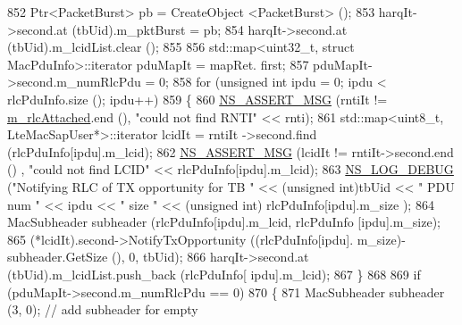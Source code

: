 \begin{DoxyCode}
852                                         Ptr<PacketBurst> pb = CreateObject <PacketBurst> ();
853                                         harqIt->second.at (tbUid).m\_pktBurst = pb;
854                                         harqIt->second.at (tbUid).m\_lcidList.clear ();
855 
856                                         std::map<uint32\_t, struct MacPduInfo>::iterator pduMapIt = mapRet.
      first;
857                                         pduMapIt->second.m\_numRlcPdu = 0;
858                                         \textcolor{keywordflow}{for} (\textcolor{keywordtype}{unsigned} \textcolor{keywordtype}{int} ipdu = 0; ipdu < rlcPduInfo.size (); ipdu++)
859                                         \{
860                                                 \hyperlink{assert_8h_aff5ece9066c74e681e74999856f08539}{NS\_ASSERT\_MSG} (rntiIt != 
      \hyperlink{classns3_1_1MmWaveEnbMac_a13e4bafd30f3edae1f5dc1192c9b3011}{m\_rlcAttached}.end (), \textcolor{stringliteral}{"could not find RNTI"} << rnti);
861                                                 std::map<uint8\_t, LteMacSapUser*>::iterator lcidIt = rntiIt
      ->second.find (rlcPduInfo[ipdu].m\_lcid);
862                                                 \hyperlink{assert_8h_aff5ece9066c74e681e74999856f08539}{NS\_ASSERT\_MSG} (lcidIt != rntiIt->second.end ()
      , \textcolor{stringliteral}{"could not find LCID"} << rlcPduInfo[ipdu].m\_lcid);
863                                                 \hyperlink{group__logging_ga413f1886406d49f59a6a0a89b77b4d0a}{NS\_LOG\_DEBUG} (\textcolor{stringliteral}{"Notifying RLC of TX opportunity
       for TB "} << (\textcolor{keywordtype}{unsigned} \textcolor{keywordtype}{int})tbUid << \textcolor{stringliteral}{" PDU num "} << ipdu << \textcolor{stringliteral}{" size "} << (\textcolor{keywordtype}{unsigned} \textcolor{keywordtype}{int}) rlcPduInfo[ipdu].m\_size
      );
864                                                 MacSubheader subheader (rlcPduInfo[ipdu].m\_lcid, rlcPduInfo
      [ipdu].m\_size);
865                                                 (*lcidIt).second->NotifyTxOpportunity ((rlcPduInfo[ipdu].
      m\_size)-subheader.GetSize (), 0, tbUid);
866                                                 harqIt->second.at (tbUid).m\_lcidList.push\_back (rlcPduInfo[
      ipdu].m\_lcid);
867                                         \}
868 
869                                         \textcolor{keywordflow}{if} (pduMapIt->second.m\_numRlcPdu == 0)
870                                         \{
871                                                 MacSubheader subheader (3, 0);  \textcolor{comment}{// add subheader for empty
}
\end{DoxyCode}

